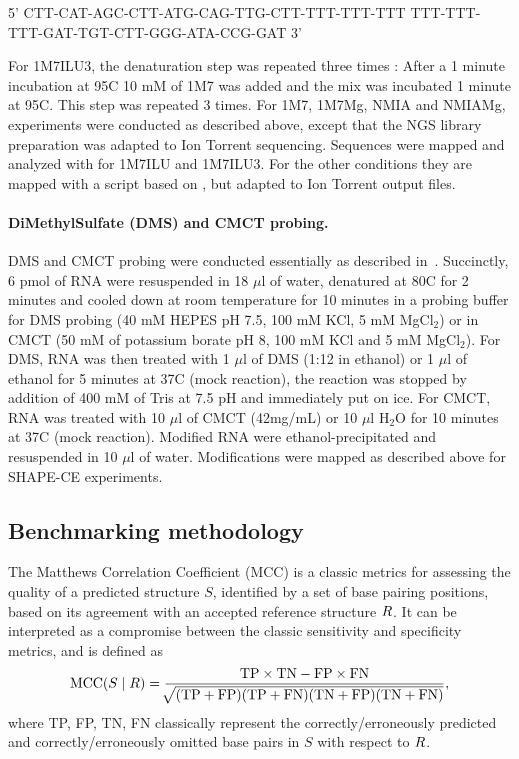 \documentclass[a4,center,fleqn]{NAR}
\begin{document}
{\centering {}%
5' CTT-CAT-AGC-CTT-ATG-CAG-TTG-CTT-TTT-TTT-TTT
   TTT-TTT-TTT-GAT-TGT-CTT-GGG-ATA-CCG-GAT 3'\\}

For 1M7ILU3, the denaturation step was repeated three times : After a 1 minute incubation at 95\degree{}C 10 mM of 1M7 was added and the mix was incubated 1 minute at 95\degree{}C. This step was repeated 3 times. For 1M7, 1M7Mg, NMIA and NMIAMg, experiments were conducted as described above, except that the NGS library preparation was adapted to Ion Torrent sequencing. Sequences were mapped and analyzed with  for 1M7ILU and 1M7ILU3. For the other conditions they are mapped with a script based on , but adapted to Ion Torrent output files.


\paragraph{DiMethylSulfate (DMS) and CMCT probing.}
DMS and CMCT probing were conducted essentially as described in~\cite{Weill2004,James2008}. Succinctly, 6 pmol of RNA were resuspended in 18 $\mu$l of water, denatured at 80\degree{}C for 2 minutes and cooled down at room temperature for 10 minutes in a probing buffer for DMS probing (40 mM HEPES pH 7.5, 100 mM KCl, 5 mM MgCl$_\text{2}$) or in CMCT (50 mM of potassium borate pH 8, 100 mM KCl and 5 mM MgCl$_\text{2}$). For DMS, RNA was then treated with 1 $\mu$l of DMS (1:12 in ethanol) or 1 $\mu$l of ethanol for 5 minutes at 37\degree{}C (mock reaction), the reaction was stopped by addition of 400 mM of Tris at 7.5 pH and immediately put on ice. For CMCT,  RNA was treated with 10 $\mu$l of CMCT (42mg/mL) or 10 $\mu$l H$_\text{2}$O for 10 minutes at 37\degree{}C (mock reaction). Modified RNA were ethanol-precipitated and resuspended in 10 $\mu$l of water. Modifications were mapped as described above for SHAPE-CE experiments.


\subsection*{Benchmarking methodology}

The Matthews Correlation Coefficient (MCC) is a classic metrics for assessing the quality of a predicted structure $S$, identified by a set of base pairing positions, based on its agreement with an accepted reference structure $R$. It can be interpreted as a compromise between the classic sensitivity and specificity metrics, and is defined as 
$$\text{MCC}(S\mid R)=\frac{\text{TP} \times \text{TN} -\text{FP} \times \text{FN}}{\sqrt[]{(\text{TP}+\text{FP})(\text{TP}+\text{FN})(\text{TN}+\text{FP})(\text{TN}+\text{FN})}},$$
where TP, FP, TN, FN classically represent the correctly/erroneously predicted and correctly/erroneously omitted base pairs in $S$ with respect to $R$.
\end{document}
